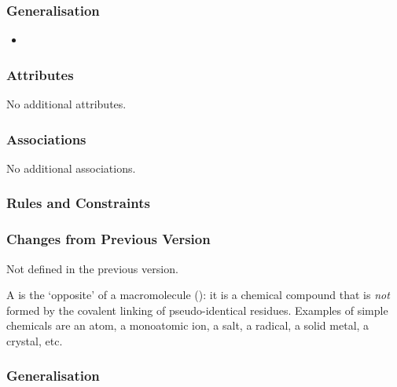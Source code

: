 \subsubsection{Generalisation}

\begin{itemize}
\item {}
\end{itemize}

\subsubsection{Attributes}

No additional attributes.

\subsubsection{Associations}

No additional associations.

\subsubsection{Rules and Constraints}

\begin{valrules}
\end{valrules}


\subsubsection{Changes from Previous Version}

Not defined in the previous version.

\label{sec:techref:simpleChemical}

A  is the `opposite' of a macromolecule
(): it is a chemical compound that is \emph{not}
formed by the covalent linking of pseudo-identical residues.  Examples
of simple chemicals are an atom, a monoatomic ion, a salt, a radical,
a solid metal, a crystal, etc.

\subsubsection{Generalisation}

